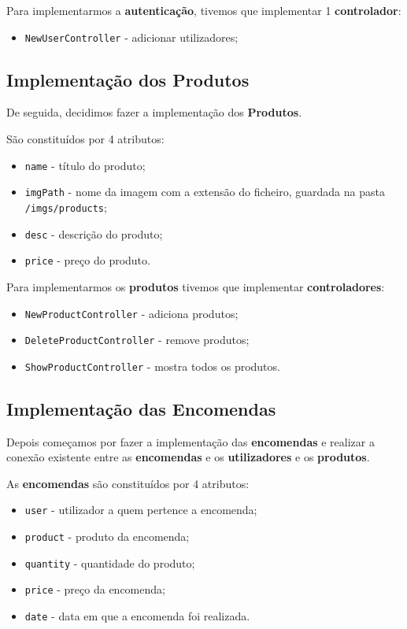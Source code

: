 \documentclass[11pt]{article}   %
\begin{document}
Para implementarmos a \textbf{autenticação}, tivemos que implementar 1 \textbf{controlador}:
\begin{itemize}
    \item \verb|NewUserController| - adicionar utilizadores;
\end{itemize}


\subsection{Implementação dos Produtos}

De seguida, decidimos fazer a implementação dos \textbf{Produtos}. 

São constituídos por 4 atributos:
\begin{itemize}
    \item \verb|name| - título do produto;
    \item \verb|imgPath| - nome da imagem com a extensão do ficheiro, guardada na pasta 
    \verb|/imgs/products|;
    \item \verb|desc| - descrição do produto;
    \item \verb|price| - preço do produto.
\end{itemize}

Para implementarmos os \textbf{produtos} tivemos que implementar  \textbf{controladores}: 
\begin{itemize}
    \item \verb|NewProductController| - adiciona produtos;
    \item \verb|DeleteProductController| - remove produtos;
    \item \verb|ShowProductController| - mostra todos os produtos.
\end{itemize}


\subsection{Implementação das Encomendas}

Depois começamos por fazer a implementação das \textbf{encomendas} e realizar a conexão existente
entre as \textbf{encomendas} e os \textbf{utilizadores} e os \textbf{produtos}.

As \textbf{encomendas} são constituídos por 4 atributos:
\begin{itemize}
    \item \verb|user| - utilizador a quem pertence a encomenda;
    \item \verb|product| - produto da encomenda;
    \item \verb|quantity| - quantidade do produto;
    \item \verb|price| - preço da encomenda;
    \item \verb|date| - data em que a encomenda foi realizada.
\end{itemize}
\end{document}
